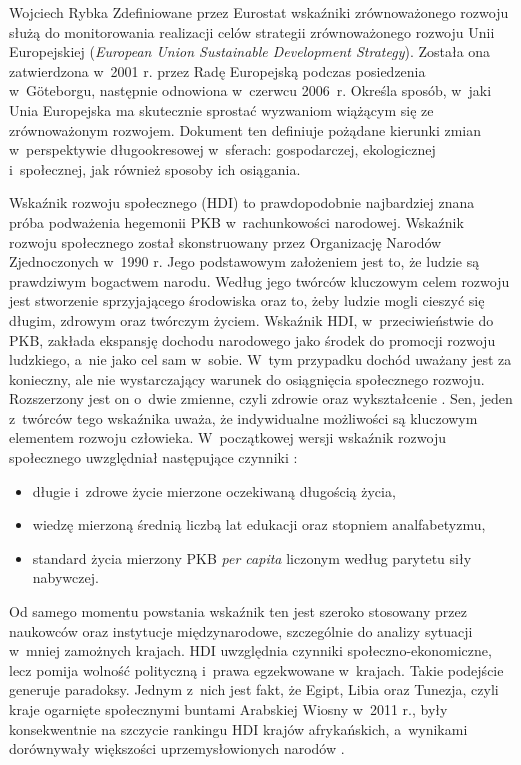\begin{artplenv}{Wojciech Rybka}
Zdefiniowane przez Eurostat wskaźniki zrównoważonego rozwoju służą do monitorowania realizacji celów strategii
zrównoważonego rozwoju Unii Europejskiej (\textit{European Union Sustainable Development Strategy}). Została ona
zatwierdzona w~2001 r. przez Radę Europejską podczas posiedzenia w~Göteborgu, następnie odnowiona w~czerwcu 2006~r.
Określa sposób, w~jaki Unia Europejska ma skutecznie sprostać wyzwaniom wiążącym się ze zrównoważonym rozwojem.
Dokument ten definiuje pożądane kierunki zmian w~perspektywie długookresowej w~sferach: gospodarczej,
ekologicznej i~społecznej, jak również sposoby ich osiągania. 

Wskaźnik rozwoju społecznego (HDI) to prawdopodobnie najbardziej znana próba podważenia hegemonii PKB w~rachunkowości
narodowej. Wskaźnik rozwoju społecznego został skonstruowany przez Organizację Narodów Zjednoczonych w~1990 r. Jego
podstawowym założeniem jest to, że ludzie są prawdziwym bogactwem narodu. Według jego twórców kluczowym celem rozwoju
jest stworzenie sprzyjającego środowiska oraz to, żeby ludzie mogli cieszyć się długim, zdrowym oraz twórczym życiem.
Wskaźnik HDI, w~przeciwieństwie do PKB, zakłada ekspansję dochodu narodowego jako środek do promocji rozwoju ludzkiego,
a~nie jako cel sam w~sobie. W~tym przypadku dochód uważany jest za konieczny, ale nie wystarczający warunek do
osiągnięcia społecznego rozwoju. Rozszerzony jest on o~dwie zmienne, czyli zdrowie oraz wykształcenie
\parencite{fioramonti_gross_2013}.
Sen, jeden z~twórców tego wskaźnika uważa, że indywidualne
możliwości są kluczowym elementem rozwoju człowieka. W~początkowej wersji wskaźnik rozwoju społecznego uwzględniał
następujące czynniki
\parencite{united_nations_development_programme_human_2019}:

\begin{itemize}
\item długie i~zdrowe życie mierzone oczekiwaną długością życia,
\item wiedzę mierzoną średnią liczbą lat edukacji oraz stopniem analfabetyzmu,
\item standard życia mierzony PKB \textit{per capita} liczonym według parytetu siły nabywczej.
\end{itemize}

Od samego momentu powstania wskaźnik ten jest szeroko stosowany przez naukowców oraz instytucje międzynarodowe,
szczególnie do analizy sytuacji w~mniej zamożnych krajach. HDI uwzględnia czynniki społeczno-ekonomiczne, lecz pomija
wolność polityczną i~prawa egzekwowane w~krajach. Takie podejście generuje paradoksy. Jednym z~nich jest fakt, że
Egipt, Libia oraz Tunezja, czyli kraje ogarnięte społecznymi buntami Arabskiej Wiosny w~2011 r., były konsekwentnie na
szczycie rankingu HDI krajów afrykańskich, a~wynikami dorównywały większości uprzemysłowionych narodów
\parencite{fioramonti_gross_2013}.


\end{artplenv}
